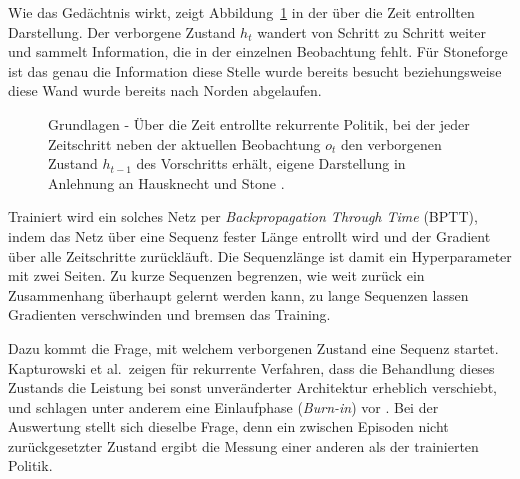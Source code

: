 \documentclass[11pt,a4paper]{article}
\begin{document}
Wie das Gedächtnis wirkt, zeigt Abbildung~\ref{fig:lstm_unrolled} in der über
die Zeit \glqq entrollten\grqq{} Darstellung. Der verborgene Zustand $h_t$
wandert von Schritt zu Schritt weiter und sammelt Information, die in der
einzelnen Beobachtung fehlt. Für Stoneforge ist das genau die Information
\glqq diese Stelle wurde bereits besucht\grqq{} beziehungsweise \glqq diese
Wand wurde bereits nach Norden abgelaufen\grqq.

\begin{figure}[h]
\centering
{}
\caption[Rekurrente Politik über die Zeit]{Grundlagen - Über die Zeit entrollte
rekurrente Politik, bei der jeder Zeitschritt neben der aktuellen Beobachtung
$o_t$ den verborgenen Zustand $h_{t-1}$ des Vorschritts erhält, eigene
Darstellung in Anlehnung an Hausknecht und Stone \cite{hausknecht2015drqn}.}
\label{fig:lstm_unrolled}
\end{figure}

Trainiert wird ein solches Netz per \emph{Backpropagation Through Time} (BPTT),
indem das Netz über eine Sequenz fester Länge entrollt wird und der Gradient
über alle Zeitschritte zurückläuft. Die Sequenzlänge ist damit ein
Hyperparameter mit zwei Seiten. Zu kurze Sequenzen begrenzen, wie weit zurück
ein Zusammenhang überhaupt gelernt werden kann, zu lange Sequenzen lassen
Gradienten verschwinden und bremsen das Training.

Dazu kommt die Frage, mit welchem verborgenen Zustand eine Sequenz startet.
Kapturowski et al.\ zeigen für rekurrente Verfahren, dass die Behandlung dieses
Zustands die Leistung bei sonst unveränderter Architektur erheblich verschiebt,
und schlagen unter anderem eine Einlaufphase (\emph{Burn-in}) vor
\cite{kapturowski2019r2d2}. Bei der Auswertung stellt sich dieselbe Frage, denn
ein zwischen Episoden nicht zurückgesetzter Zustand ergibt die Messung einer
anderen als der trainierten Politik.
\end{document}
